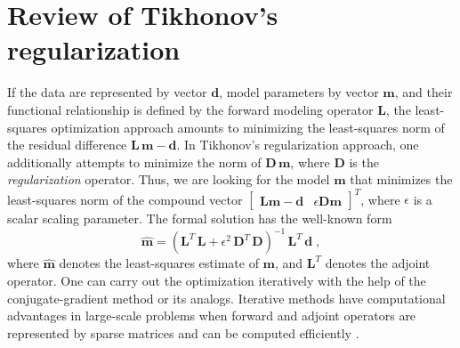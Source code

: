 \section{Review of Tikhonov's regularization}
If the data are represented by vector $\mathbf{d}$, model parameters by
vector $\mathbf{m}$, and their functional relationship is defined by the
forward modeling operator $\mathbf{L}$, the least-squares optimization
approach amounts to minimizing the least-squares norm of the residual
difference $\mathbf{L\,m - d}$. In Tikhonov's regularization approach, one
additionally attempts to minimize the norm of $\mathbf{D\,m}$, where $\mathbf{D}$
is the \emph{regularization} operator. Thus, we are looking for the model
$\mathbf{m}$ that minimizes the least-squares norm of the compound vector
$\left[\begin{array}{cc} \mathbf{L m - d} & \epsilon \mathbf{D m}
  \end{array}\right]^T$,
where $\epsilon$ is a scalar scaling parameter. The formal solution has the
well-known form 
\begin{equation}
  \widehat{\mathbf{m}} = 
  \left(\mathbf{L}^T\,\mathbf{L} +
    \epsilon^2\,\mathbf{D}^T\,\mathbf{D}\right)^{-1}\,\mathbf{L}^T\,\mathbf{d}\;,
  \label{eqn:minv1}  
\end{equation}
where $\widehat{\mathbf{m}}$ denotes the least-squares estimate of $\mathbf{m}$,
and $\mathbf{L}^T$ denotes the adjoint operator.  One can carry out the
optimization iteratively with the help of the conjugate-gradient method
\cite[]{hestenes} or its analogs. Iterative methods have computational
advantages in large-scale problems when forward and adjoint operators are
represented by sparse matrices and can be computed efficiently
\cite[]{saad,vorst}.

